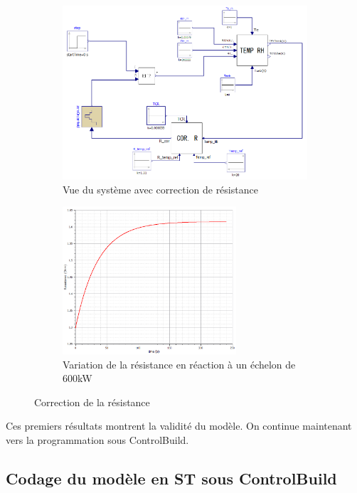 \documentclass[a4paper]{report}
\begin{document}
	\begin{figure}[h]
		
		\begin{subfigure}{0.5\textwidth}
			\includegraphics[width=0.9\linewidth]{rh_modelica_rcor} 
			\caption{Vue du système avec correction de résistance}
			\label{fig:subim2_1}
		\end{subfigure}
		\begin{subfigure}{0.5\textwidth}
			\includegraphics[height=5.5cm]{rcor_result}
			\caption{Variation de la résistance en réaction à un échelon de 600kW}
			\label{fig:subim2_2}
		\end{subfigure}
		\caption{Correction de la résistance}
		\label{fig:image2_2}
	\end{figure}
	
	Ces premiers résultats montrent la validité du modèle. On continue maintenant vers la programmation sous ControlBuild.
	
	\pagebreak %

	\subsection{Codage du modèle en ST sous ControlBuild}
	
\end{document}

